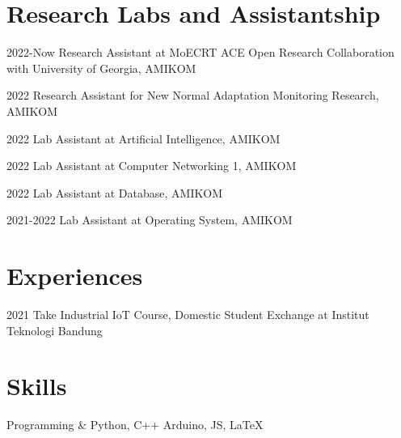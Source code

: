 \documentclass[12pt,letterpaper]{report}
\newcommand{\listitemspace}{0.25em}
\renewenvironment{itemize}
{\begin{list}{}{\setlength{\leftmargin}{0em}
                \setlength{\parskip}{0em}
                \setlength{\itemsep}{\listitemspace}
                \setlength{\parsep}{\listitemspace}}}
{\end{list}}
\begin{document}

    \section*{Research Labs and Assistantship}
    \begin{tablist}
        \item[2022-Now] \tab{}Research Assistant at MoECRT ACE Open Research Collaboration with University of Georgia, AMIKOM \\
        \item[2022] \tab{}Research Assistant for New Normal Adaptation Monitoring Research, AMIKOM \\
        \item[2022] \tab{}Lab Assistant at Artificial Intelligence, AMIKOM \\
        \item[2022] \tab{}Lab Assistant at Computer Networking 1, AMIKOM \\
        \item[2022] \tab{}Lab Assistant at Database, AMIKOM \\
        \item[2021-2022] \tab{}Lab Assistant at Operating System, AMIKOM \\
    \end{tablist}



    \section*{Experiences}
    \begin{tablist}
        \item[2021] \tab{}Take Industrial IoT Course, Domestic Student Exchange at Institut Teknologi Bandung
    \end{tablist}

    \section*{Skills}
    \begin{tablist}
        Programming & Python, C++ Arduino, JS, \LaTeX \\
    \end{tablist}
\end{document}
